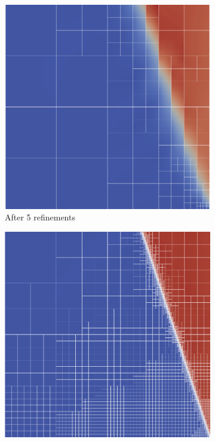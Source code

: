 \documentclass[Dissertation.tex]{subfiles}
\begin{document}
\begin{figure}[ht]
\begin{subfigure}[t]{0.32\textwidth}
\includegraphics[width=\textwidth]{Dissertation/Noh/Robust-mesh5.png}
\caption{After 5 refinements}
\end{subfigure}
\begin{subfigure}[t]{0.32\textwidth}
\centering
\includegraphics[width=\textwidth]{Dissertation/Noh/Robust-mesh10.png}

\end{subfigure}
\end{figure}
\end{document}

